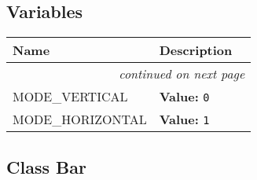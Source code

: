 
  \subsection{Variables}

    \vspace{-1cm}
\hspace{\varindent}\begin{longtable}{|p{\varnamewidth}|p{\vardescrwidth}|l}
\cline{1-2}
\cline{1-2} \centering \textbf{Name} & \centering \textbf{Description}& \\
\cline{1-2}
\endhead\cline{1-2}\multicolumn{3}{r}{\small\textit{continued on next page}}\\\endfoot\cline{1-2}
\endlastfoot\raggedright M\-O\-D\-E\-\_\-V\-E\-R\-T\-I\-C\-A\-L\- & \raggedright \textbf{Value:} 
{\tt 0}&\\
\cline{1-2}
\raggedright M\-O\-D\-E\-\_\-H\-O\-R\-I\-Z\-O\-N\-T\-A\-L\- & \raggedright \textbf{Value:} 
{\tt 1}&\\
\cline{1-2}
\end{longtable}



\subsection{Class Bar}

